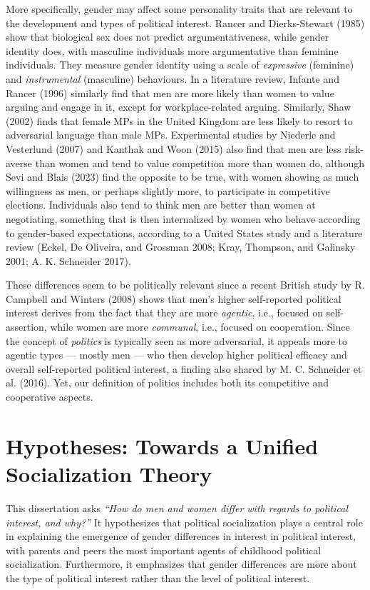 \documentclass[
  letterpaper,
  DIV=11,
  numbers=noendperiod]{scrreprt}
\begin{document}
More specifically, gender may affect some personality traits that are
relevant to the development and types of political interest. Rancer and
Dierks-Stewart (1985) show that biological sex does not predict
argumentativeness, while gender identity does, with masculine
individuals more argumentative than feminine individuals. They measure
gender identity using a scale of \emph{expressive} (feminine) and
\emph{instrumental} (masculine) behaviours. In a literature review,
Infante and Rancer (1996) similarly find that men are more likely than
women to value arguing and engage in it, except for workplace-related
arguing. Similarly, Shaw (2002) finds that female MPs in the United
Kingdom are less likely to resort to adversarial language than male MPs.
Experimental studies by Niederle and Vesterlund (2007) and Kanthak and
Woon (2015) also find that men are less risk-averse than women and tend
to value competition more than women do, although Sevi and Blais (2023)
find the opposite to be true, with women showing as much willingness as
men, or perhaps slightly more, to participate in competitive elections.
Individuals also tend to think men are better than women at negotiating,
something that is then internalized by women who behave according to
gender-based expectations, according to a United States study and a
literature review (Eckel, De Oliveira, and Grossman 2008; Kray,
Thompson, and Galinsky 2001; A. K. Schneider 2017).

These differences seem to be politically relevant since a recent British
study by R. Campbell and Winters (2008) shows that men's higher
self-reported political interest derives from the fact that they are
more \emph{agentic}, i.e., focused on self-assertion, while women are
more \emph{communal}, i.e., focused on cooperation. Since the concept of
\emph{politics} is typically seen as more adversarial, it appeals more
to agentic types --- mostly men --- who then develop higher political
efficacy and overall self-reported political interest, a finding also
shared by M. C. Schneider et al. (2016). Yet, our definition of politics
includes both its competitive and cooperative aspects.

\hypertarget{hypotheses-towards-a-unified-socialization-theory}{%
\section{Hypotheses: Towards a Unified Socialization
Theory}\label{hypotheses-towards-a-unified-socialization-theory}}

This dissertation asks \emph{``How do men and women differ with regards
to political interest, and why?''} It hypothesizes that political
socialization plays a central role in explaining the emergence of gender
differences in interest in political interest, with parents and peers
the most important agents of childhood political socialization.
Furthermore, it emphasizes that gender differences are more about the
type of political interest rather than the level of political interest.
\end{document}
